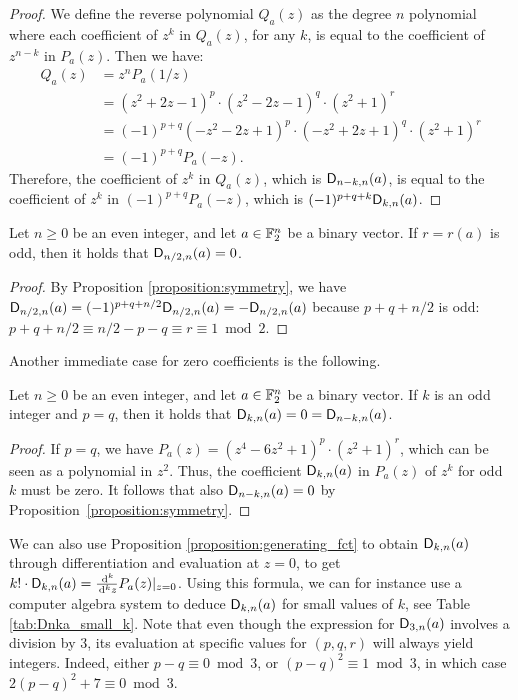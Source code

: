 \documentclass{llncs}
\begin{document}
\begin{proof}
	We define the reverse polynomial  $Q_a(z)$ as the degree $n$ polynomial where each coefficient of $z^k$ in $Q_a(z)$, for any $k$, is equal to the coefficient of $z^{n-k}$ in $P_a(z)$. Then we have:
	\begin{align*}
		Q_a(z)&=z^nP_a(1/z)\\
		&=(z^2+2z-1)^p\cdot(z^2-2z-1)^q\cdot(z^2+1)^r\\
		&=(-1)^{p+q}(-z^2-2z+1)^p\cdot(-z^2+2z+1)^q\cdot(z^2+1)^r\\
		&=(-1)^{p+q}P_a(-z).
	\end{align*}
	Therefore, the coefficient of $z^k$ in $Q_a(z)$, which is $\Dnka n{n-k}a$, is equal to the coefficient of $z^k$ in $(-1)^{p+q}P_a(-z)$, which is $(-1)^{p+q+k}\Dnka nka$.
\end{proof}

\begin{Corollary}
    Let $n\geq 0$ be an even integer, and let $a\in\F_2^n$ be a binary vector. If $r=r(a)$ is odd, then it holds that $\Dnka n{n/2}a=0$.
\end{Corollary}

\begin{proof}
	By Proposition \ref{proposition:symmetry}, we have $\Dnka n{n/2}a=(-1)^{p+q+n/2}\Dnka n{n/2}a=-\Dnka n{n/2}a$ because $p+q+n/2$ is odd: $p+q+n/2\equiv n/2-p-q\equiv r\equiv 1\bmod 2$.
\end{proof}

Another immediate case for zero coefficients is the following.

\begin{proposition}
    Let $n\geq 0$ be an even integer, and let $a\in\F_2^n$ be a binary vector. If $k$ is an odd integer and  $p=q$, then it holds that $\Dnka nka=0=\Dnka n{n-k}a$.
\end{proposition}

\begin{proof}
    If $p=q$, we have $P_a(z)=(z^4-6z^2+1)^p\cdot(z^2+1)^r$, which can be seen as a polynomial in $z^2$. Thus, the coefficient $\Dnka nka$ in $P_a(z)$ of $z^k$ for odd $k$ must be zero. It follows that also $\Dnka n{n-k}a=0$ by Proposition~\ref{proposition:symmetry}.
\end{proof}

\begin{remark}\label{remark:D_nka_differentiation}
    We can also use Proposition \ref{proposition:generating_fct} to obtain $\Dnka nka$ through differentiation and evaluation at $z=0$, to get $k!\cdot\Dnka nka=\frac{\dd^k}{\dd^k z}P_a(z)\vert_{z=0}$. Using this formula, we can for instance use a computer algebra system to deduce $\Dnka nka$ for small values of $k$, see Table \ref{tab:Dnka_small_k}. Note that even though the expression for $\Dnka n3a$ involves a division by $3$, its evaluation at specific values for $(p,q,r)$ will always yield integers. Indeed, either $p-q\equiv 0\bmod 3$, or $(p-q)^2\equiv 1\bmod 3$, in which case $2(p-q)^2+7\equiv 0\bmod 3$.
\end{remark}
\end{document}
